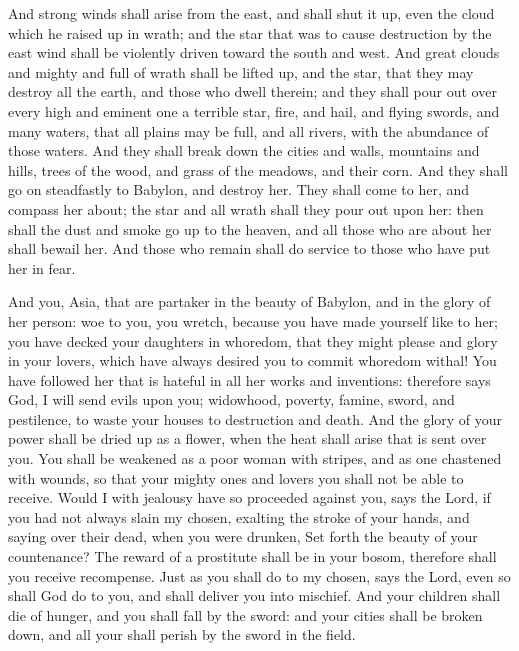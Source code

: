{And strong winds shall arise from the east, and shall shut it up, even the cloud which he raised up in wrath; and the star that was to cause destruction by the east wind shall be violently driven toward the south and west.
And great clouds and mighty and full of wrath shall be lifted up, and the star, that they may destroy all the earth, and those who dwell therein; and they shall pour out over every high and eminent one a terrible star,
fire, and hail, and flying swords, and many waters, that all plains may be full, and all rivers, with the abundance of those waters.
And they shall break down the cities and walls, mountains and hills, trees of the wood, and grass of the meadows, and their corn.
And they shall go on steadfastly to Babylon, and destroy her.
They shall come to her, and compass her about; the star and all wrath shall they pour out upon her: then shall the dust and smoke go up to the heaven, and all those who are about her shall bewail her.
And those who remain shall do service to those who have put her in fear.
\par }{\PP {}And you, Asia, that are partaker in the beauty of Babylon, and in the glory of her person:
woe to you, you wretch, because you have made yourself like to her; you have decked your daughters in whoredom, that they might please and glory in your lovers, which have always desired you to commit whoredom withal!
You have followed her that is hateful in all her works and inventions: therefore says God,
I will send evils upon you; widowhood, poverty, famine, sword, and pestilence, to waste your houses to destruction and death.
And the glory of your power shall be dried up as a flower, when the heat shall arise that is sent over you.
You shall be weakened as a poor woman with stripes, and as one chastened with wounds, so that your mighty ones and
{} lovers you shall not be able to receive.
Would I with jealousy have so proceeded against you, says the Lord,
if you had not always slain my chosen, exalting the stroke of your hands, and saying over their
 dead, when you were drunken,
Set forth the beauty of your countenance?
The reward of a prostitute shall be in your bosom, therefore shall you receive recompense.
Just as you shall do to my chosen, says the Lord, even so shall God do to you, and shall deliver you into mischief.
And your children shall die of hunger, and you shall fall by the sword: and your cities shall be broken down, and all your shall perish by the sword in the field.
}

